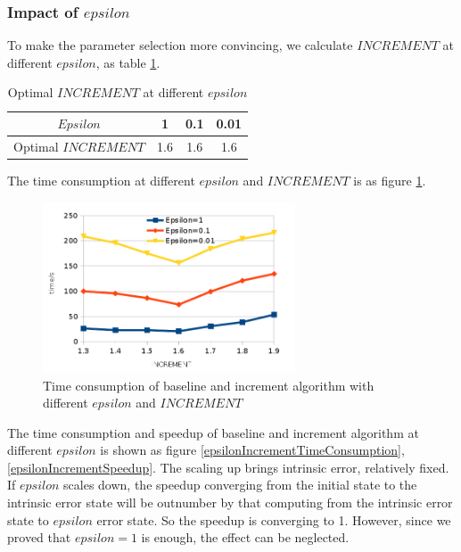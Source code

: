 \documentclass{acm_proc_article-sp}
\begin{document}
\subsubsection{Impact of $epsilon$}

To make the parameter selection more convincing, we calculate $INCREMENT$ at different $epsilon$, as table \ref{TEpsilonScale}.

\begin{table}[htbp]
  \centering\caption{\label{TEpsilonScale}Optimal $INCREMENT$ at different $epsilon$}
  \begin{tabular}{|c|c|c|c|}
  \hline
  $Epsilon$ & 1 & 0.1 & 0.01\\
  \hline
  Optimal $INCREMENT$ & 1.6 & 1.6 & 1.6\\
  \hline
  \end{tabular}
\end{table}

The time consumption at different $epsilon$ and $INCREMENT$ is as figure \ref{differentepsilondifferentfactortime}.

\begin{figure}[htbp]
\centering 
\includegraphics[width=7.5cm]{differentepsilondifferentfactortime.png}
\caption{Time consumption of baseline and increment algorithm with different $epsilon$ and $INCREMENT$}
\label{differentepsilondifferentfactortime} 
\end{figure}

The time consumption and speedup of baseline and increment algorithm at different $epsilon$ is shown as figure \ref{epsilonIncrementTimeConsumption}, \ref{epsilonIncrementSpeedup}. 
The scaling up brings intrinsic error, relatively fixed. If $epsilon$ scales down, the speedup converging from the initial state to the intrinsic error state will be outnumber by that computing from the intrinsic error state to $epsilon$ error state. So the speedup is converging to 1. However, since we proved that $epsilon=1$ is enough, the effect can be neglected. 
\end{document}
